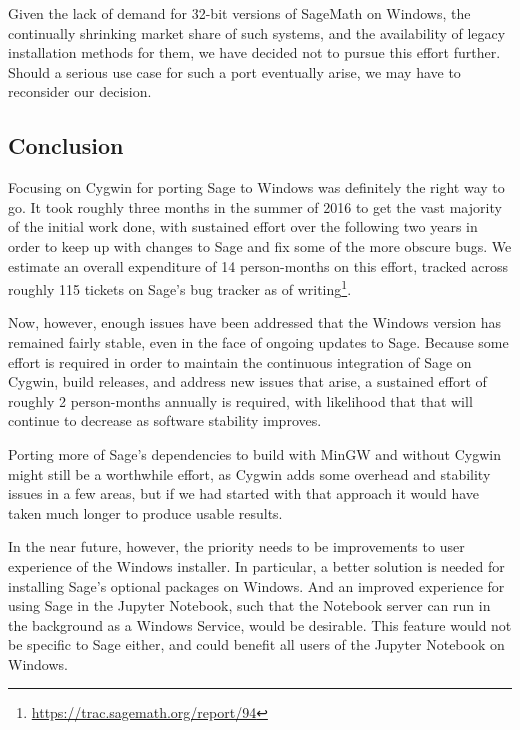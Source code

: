 Given the lack of demand for 32-bit versions of SageMath on Windows, the
continually shrinking market share of such systems, and the availability of
legacy installation methods for them, we have decided not to pursue this effort
further. Should a serious use case for such a port eventually arise, we may
have to reconsider our decision.

\hypertarget{conclusion}{%
\subsection{Conclusion}\label{conclusion}}

Focusing on Cygwin for porting Sage to Windows was definitely the right way to
go. It took roughly three months in the summer of 2016 to get the vast majority
of the initial work done, with sustained effort over the following two years in
order to keep up with changes to Sage and fix some of the more obscure bugs.
We estimate an overall expenditure of 14 person-months on this effort, tracked
across roughly 115 tickets on Sage's bug tracker as of
writing\footnote{\url{https://trac.sagemath.org/report/94}}.

Now, however, enough issues have been addressed that the Windows version has
remained fairly stable, even in the face of ongoing updates to Sage. Because
some effort is required in order to maintain the continuous integration of Sage
on Cygwin, build releases, and address new issues that arise, a sustained
effort of roughly 2 person-months annually is required, with likelihood that
that will continue to decrease as software stability improves.

Porting more of Sage's dependencies to build with MinGW and without Cygwin
might still be a worthwhile effort, as Cygwin adds some overhead and stability
issues in a few areas, but if we had started with that approach it would have
taken much longer to produce usable results.

In the near future, however, the priority needs to be improvements to
user experience of the Windows installer. In particular, a better
solution is needed for installing Sage's optional packages on Windows.
And an improved experience for using Sage in the Jupyter Notebook, such
that the Notebook server can run in the background as a Windows Service,
would be desirable. This feature would not be specific to Sage either, and
could benefit all users of the Jupyter Notebook on Windows.
